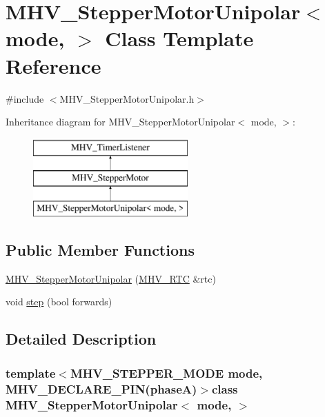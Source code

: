 \hypertarget{class_m_h_v___stepper_motor_unipolar}{\section{M\-H\-V\-\_\-\-Stepper\-Motor\-Unipolar$<$ mode, $>$ Class Template Reference}
\label{class_m_h_v___stepper_motor_unipolar}
}


{\ttfamily \#include $<$M\-H\-V\-\_\-\-Stepper\-Motor\-Unipolar.\-h$>$}

Inheritance diagram for M\-H\-V\-\_\-\-Stepper\-Motor\-Unipolar$<$ mode, $>$\-:\begin{figure}[H]
\begin{center}
\leavevmode
\includegraphics[height=3.000000cm]{class_m_h_v___stepper_motor_unipolar}
\end{center}
\end{figure}
\subsection*{Public Member Functions}
\begin{DoxyCompactItemize}
\item 
\hyperlink{class_m_h_v___stepper_motor_unipolar_a9c27da6eca2227a613530b744e7bba33}{M\-H\-V\-\_\-\-Stepper\-Motor\-Unipolar} (\hyperlink{class_m_h_v___r_t_c}{M\-H\-V\-\_\-\-R\-T\-C} \&rtc)
\item 
void \hyperlink{class_m_h_v___stepper_motor_unipolar_a29622a97fbf539ea1ad466c1d50e9657}{step} (bool forwards)
\end{DoxyCompactItemize}


\subsection{Detailed Description}
\subsubsection*{template$<$M\-H\-V\-\_\-\-S\-T\-E\-P\-P\-E\-R\-\_\-\-M\-O\-D\-E mode, M\-H\-V\-\_\-\-D\-E\-C\-L\-A\-R\-E\-\_\-\-P\-I\-N(phase\-A)$>$class M\-H\-V\-\_\-\-Stepper\-Motor\-Unipolar$<$ mode, $>$}

